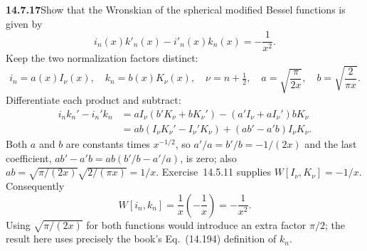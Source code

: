 \par\bigskip
\noindent\textbf{14.7.17}\quad Show that the Wronskian of the spherical
modified Bessel functions is given by
\[
i_{n}(x)k'_{n}(x)-i'_{n}(x)k_{n}(x)=-\frac{1}{x^{2}}.
\]
\solution
Keep the two normalization factors distinct:
\[
i_n=a(x)I_\nu(x),\quad k_n=b(x)K_\nu(x),\quad
\nu=n+\tfrac12,\quad
a=\sqrt{\frac\pi{2x}},\quad b=\sqrt{\frac2{\pi x}}.
\]
Differentiate each product and subtract:
\begin{align*}
i_nk_n'-i_n'k_n
&=aI_\nu(b'K_\nu+bK_\nu')
-(a'I_\nu+aI_\nu')bK_\nu\\
&=ab(I_\nu K_\nu'-I_\nu'K_\nu)
+(ab'-a'b)I_\nu K_\nu.
\end{align*}
Both $a$ and $b$ are constants times $x^{-1/2}$, so
$a'/a=b'/b=-1/(2x)$ and the last coefficient,
$ab'-a'b=ab(b'/b-a'/a)$, is zero; also
$ab=\sqrt{\pi/(2x)}\sqrt{2/(\pi x)}=1/x$. Exercise~14.5.11 supplies
$W[I_\nu,K_\nu]=-1/x$. Consequently
\[
\boxed{W[i_n,k_n]=\frac1x\left(-\frac1x\right)=-\frac1{x^2}.}
\]
Using $\sqrt{\pi/(2x)}$ for both functions would introduce an
extra factor $\pi/2$; the result here uses precisely the book's
Eq.~(14.194) definition of $k_n$.
